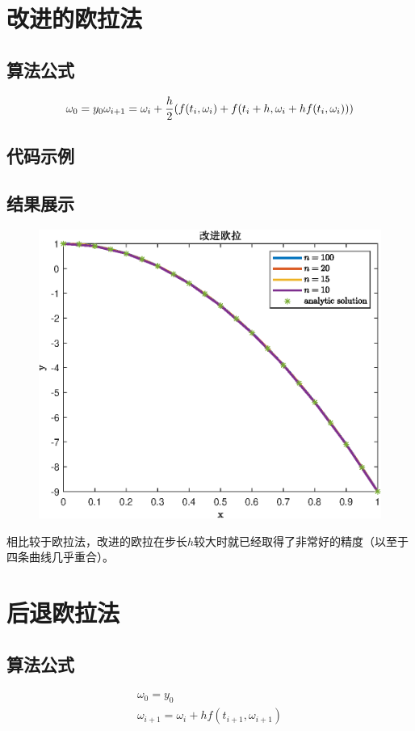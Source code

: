 \documentclass{ctexart}
\numberwithin{equation}{section}    %
\begin{document}
\section{改进的欧拉法}
\subsection{算法公式}
\begin{equation}
    \omega_0 = y_0\\
    \omega_{i+1} = \omega_i + \frac{h}{2}(f(t_i,\omega_i)+f(t_i+h,\omega_i+hf(t_i,\omega_i)))\\
\end{equation}
\subsection{代码示例}


\subsection{结果展示}
\begin{figure}[htp]
    \centering
    \includegraphics[width=0.7\linewidth]{fig/改进欧拉.eps}
\end{figure}
相比较于欧拉法，改进的欧拉在步长$h$较大时就已经取得了非常好的精度（以至于四条曲线几乎重合）。
\section{后退欧拉法}
\subsection{算法公式}
\begin{equation}
    \begin{aligned}
        \omega_0=y_0\\
        \omega_{i+1}=\omega_{i}+hf(t_{i+1},\omega_{i+1})
    \end{aligned}
\end{equation}
\end{document}
